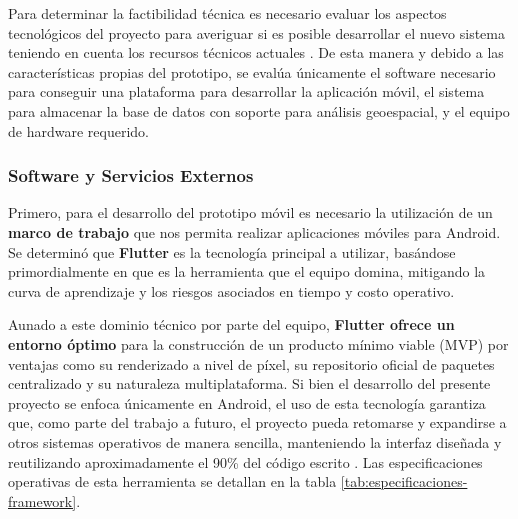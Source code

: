 Para determinar la factibilidad técnica es necesario evaluar los aspectos tecnológicos del proyecto para averiguar si es posible desarrollar el nuevo sistema teniendo en cuenta los recursos técnicos actuales \cite{kendall_analisis}. De esta manera y debido a las características propias del prototipo, se evalúa únicamente el software necesario para conseguir una plataforma para desarrollar la aplicación móvil, el sistema para almacenar la base de datos con soporte para análisis geoespacial, y el equipo de hardware requerido.

\subsubsection{Software y Servicios Externos}

\label{subsubsec: software}
Primero, para el desarrollo del prototipo móvil es necesario la utilización de un \textbf{marco de trabajo} que nos permita realizar aplicaciones móviles para Android. Se determinó que \textbf{Flutter} es la tecnología principal a utilizar, basándose primordialmente en que es la herramienta que el equipo domina, mitigando la curva de aprendizaje y los riesgos asociados en tiempo y costo operativo.

Aunado a este dominio técnico por parte del equipo, \textbf{Flutter ofrece un entorno óptimo} para la construcción de un producto mínimo viable (MVP) por ventajas como su renderizado a nivel de píxel, su repositorio oficial de paquetes centralizado y su naturaleza multiplataforma\cite{flutter_businessvalue}. Si bien el desarrollo del presente proyecto se enfoca únicamente en Android, el uso de esta tecnología garantiza que, como parte del trabajo a futuro, el proyecto pueda retomarse y expandirse a otros sistemas operativos de manera sencilla, manteniendo la interfaz diseñada y reutilizando aproximadamente el 90\% del código escrito \cite{suri2022cross}. Las especificaciones operativas de esta herramienta se detallan en la tabla \ref{tab:especificaciones-framework}.


